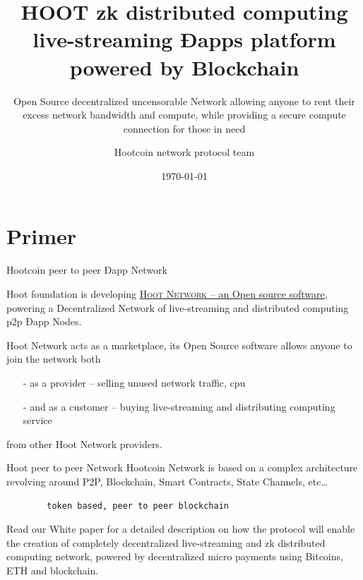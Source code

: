 \documentclass[10pt]{beamer}
\title{HOOT zk distributed computing live-streaming Ðapps platform powered by Blockchain}
\subtitle{Open Source decentralized uncensorable Network allowing anyone to rent their excess network bandwidth and compute, while providing a secure compute connection for those in need}
\date{\today}
\author{Hootcoin network protocol team}
\institute{Hootcoin Foundation}
\newcommand{\themename}{\textbf{\textsc{metropolis}}\xspace}
\begin{document}
\maketitle


\section{Primer}

\begin{frame}[fragile]{Hootcoin peer to peer Ðapp Network }

  Hoot foundation is developing \href{https://onhoot.com/tokensale}{\textsc{Hoot Network} – an Open source software}, powering a Decentralized Network of live-streaming and distributed computing p2p Ðapp Nodes.
  

Hoot Network acts as a marketplace, its Open Source software allows anyone to join the network both 

\begin{itemize}
\item[-]as a provider – selling unused network traffic, cpu
\item[-]and as a customer – buying live-streaming and distributing computing service
\end{itemize}
 from other Hoot Network providers. 
\end{frame}
\begin{frame}[fragile]{Hoot peer to peer Network }
  Hootcoin Network is based on a complex architecture revolving around   P2P, Blockchain, Smart Contracts, State Channels, etc\ldots
    \begin{verbatim}  
        token based, peer to peer blockchain 
  \end{verbatim}
  
   Read our White paper for a detailed description on how the protocol will enable the creation of completely decentralized live-streaming and zk distributed computing network, powered by decentralized micro payments using Bitcoins, ETH and blockchain. 


\end{frame}
\end{document}
